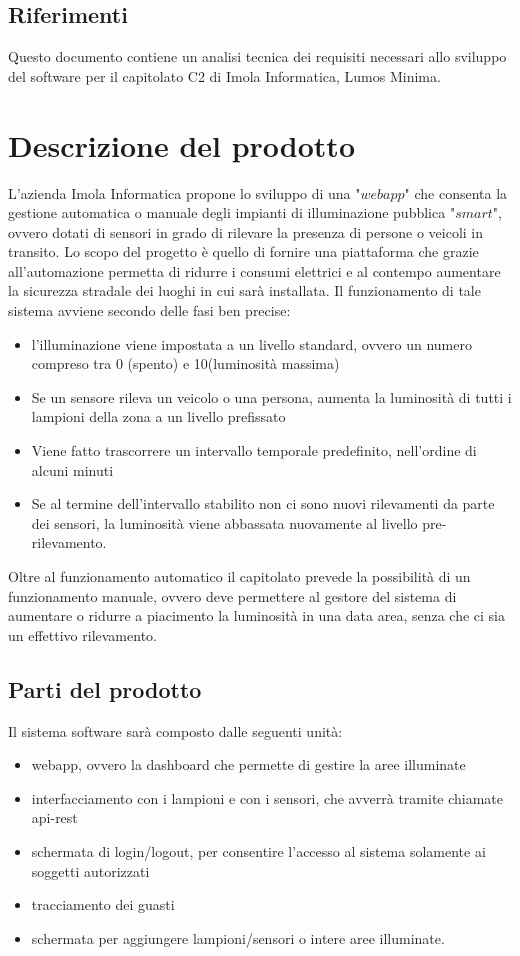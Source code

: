 \documentclass[12pt]{article}
\begin{document}
\subsection{Riferimenti}
Questo documento contiene un analisi tecnica dei requisiti necessari allo sviluppo del software per il capitolato C2 di Imola Informatica, Lumos Minima.

\section{Descrizione del prodotto}
L'azienda Imola Informatica propone lo sviluppo di una "$webapp$" che consenta la gestione automatica o manuale degli impianti di illuminazione pubblica "$smart$", ovvero dotati di sensori in grado di rilevare la presenza di persone o veicoli in transito.
Lo scopo del progetto è quello di fornire una piattaforma che grazie all'automazione permetta di ridurre i consumi elettrici e al contempo aumentare la sicurezza stradale dei luoghi in cui sarà installata.
Il funzionamento di tale sistema avviene secondo delle fasi ben precise:
\begin{itemize}
	\item l'illuminazione viene impostata a un livello standard, ovvero un numero compreso tra 0 (spento) e 10(luminosità massima)
	\item Se un sensore rileva un veicolo o una persona, aumenta la luminosità di tutti i lampioni della zona a un livello prefissato
	\item Viene fatto trascorrere un intervallo temporale predefinito, nell'ordine di alcuni minuti
	\item Se al termine dell'intervallo stabilito non ci sono nuovi rilevamenti da parte dei sensori, la luminosità viene abbassata nuovamente al livello pre-rilevamento.
\end{itemize}
Oltre al funzionamento automatico il capitolato prevede la possibilità di un funzionamento manuale, ovvero deve permettere al gestore del sistema di aumentare o ridurre a piacimento la luminosità in una data area, senza che ci sia un effettivo rilevamento.

\subsection{Parti del prodotto}
Il sistema software sarà composto dalle seguenti unità:
\begin{itemize}
	\item webapp, ovvero la dashboard che permette di gestire la aree illuminate
	\item interfacciamento con i lampioni e con i sensori, che avverrà tramite chiamate api-rest
	\item schermata di login/logout, per consentire l'accesso al sistema solamente ai soggetti autorizzati
	\item tracciamento dei guasti
	\item schermata per aggiungere lampioni/sensori o intere aree illuminate.
\end{itemize}
\end{document}
